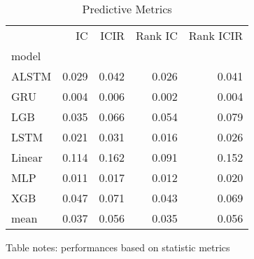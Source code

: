 \documentclass[10pt,letterpaper]{article}
\begin{document}
\begin{table}[!ht]
\centering
\caption{Predictive Metrics}
\label{Statistic Metric}
\begin{tabular}{lrrrr}
\toprule
{} &     IC &   ICIR &  Rank IC &  Rank ICIR \\
model  &        &        &          &            \\
\midrule
ALSTM  &  0.029 &  0.042 &    0.026 &      0.041 \\
GRU    &  0.004 &  0.006 &    0.002 &      0.004 \\
LGB    &  0.035 &  0.066 &    0.054 &      0.079 \\
LSTM   &  0.021 &  0.031 &    0.016 &      0.026 \\
Linear &  0.114 &  0.162 &    0.091 &      0.152 \\
MLP    &  0.011 &  0.017 &    0.012 &      0.020 \\
XGB    &  0.047 &  0.071 &    0.043 &      0.069 \\
mean   &  0.037 &  0.056 &    0.035 &      0.056 \\
\bottomrule
\end{tabular}
\begin{flushleft}
Table notes: performances based on statistic metrics
\end{flushleft}
\label{table1}
\end{table}
\end{document}

